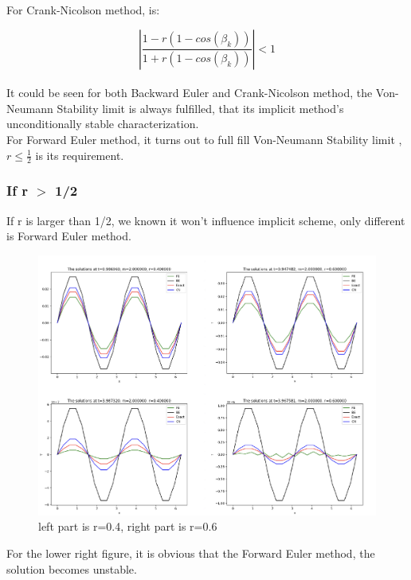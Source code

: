 \documentclass[12pt]{article}
\begin{document}
For Crank-Nicolson method, is:

$$ \left\vert  \frac{1-r\left( 1-cos\left( \beta_{k} \right)  \right)  }{1+r\left( 1-cos\left( \beta_{k} \right)  \right) }\right\vert  <1 $$\\




It could be seen for both Backward Euler and Crank-Nicolson method, the Von-Neumann Stability limit is always fulfilled, that its implicit method's unconditionally stable characterization.\\

For Forward Euler method, it turns out to full fill Von-Neumann Stability limit , $r \leqslant \frac{1}{2} $ is its requirement.




\subsubsection{If r $>$ 1/2 }


If r is larger than 1/2, we known it won't influence implicit scheme, only different is Forward Euler method.


\begin{figure}[H] 
\centering 
\includegraphics[scale=0.3]{r too large.jpg} 
\caption{left part is r=0.4, right part is r=0.6} 
\label{TDMA Solver code} 
\end{figure}

For the lower right figure, it is obvious that the Forward Euler method, the solution becomes unstable.
\end{document}
